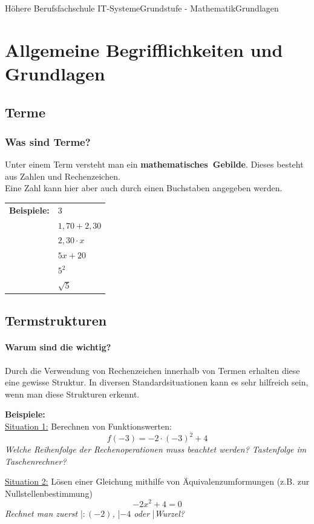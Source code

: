 \documentclass[11pt,twocolumn,oneside,openany,headings=optiontotoc,11pt,numbers=noenddot]{article}
\begin{document}
	\begin{worksheet}{Höhere Berufsfachschule IT-Systeme}{Grundstufe - Mathematik}{Grundlagen}
		\section{Allgemeine Begrifflichkeiten und Grundlagen}
		\subsection{Terme}
		\subsubsection*{Was sind Terme?} Unter einem Term versteht man ein \mbox{\textbf{mathematisches Gebilde}}. Dieses besteht aus Zahlen und Rechenzeichen.\\
		Eine Zahl kann hier aber auch durch einen Buchstaben angegeben werden.\\
		\par
		\begin{tabularx}{0.5\textwidth}{ll}
			\noindent
			\textbf{Beispiele:} & \(3\)\\
			& \(1,70+2,30\)\\
			& \(2,30\cdot x\)\\
			& \(5x + 20\)\\
			& \(5^2\)\\
			& \(\sqrt{5}\)\\
		\end{tabularx}
		\subsection{Termstrukturen}
		\paragraph{Warum sind die wichtig?}
		Durch die Verwendung von Rechenzeichen innerhalb von Termen erhalten diese eine gewisse Struktur. In diversen Standardsituationen kann es sehr hilfreich sein, wenn man diese Strukturen erkennt.
		\begin{framed}
			\noindent
			\textbf{Beispiele:}\\
			\underline{Situation 1:} Berechnen von Funktionswerten:
			\[f(-3) = -2\cdot (-3)^2 + 4\]
			\textit{Welche Reihenfolge der Rechenoperationen muss beachtet werden? Tastenfolge im Taschenrechner?}\\
			\par
			\underline{Situation 2:} Lösen einer Gleichung mithilfe von Äquivalenzumformungen (z.B. zur Nullstellenbestimmung)
			\[-2x^2 +4 = 0\]
			\textit{Rechnet man zuerst }|\textit{\(:(-2)\), }|\textit{\(-4\) oder }|\textit{\glqq{}Wurzel\grqq{}?}
		\end{framed}

\end{worksheet}
\end{document}
